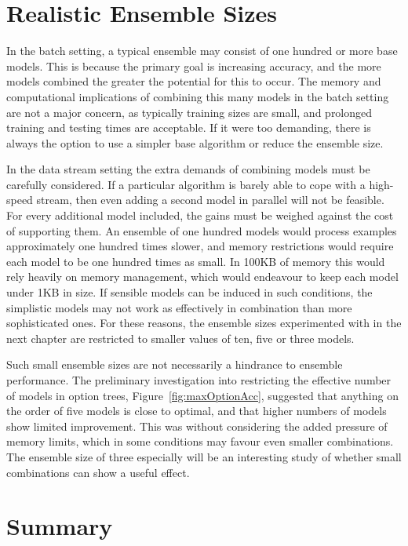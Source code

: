 \section{Realistic Ensemble Sizes}
\label{sec:enssizes}

In the batch setting, a typical ensemble may consist of one hundred or more base models. This is because the primary goal is increasing accuracy, and the more models combined the greater the potential for this to occur. The memory and computational implications of combining this many models in the batch setting are not a major concern, as typically training sizes are small, and prolonged training and testing times are acceptable. If it were too demanding, there is always the option to use a simpler base algorithm or reduce the ensemble size.

In the data stream setting the extra demands of combining models must be carefully considered. If a particular algorithm is barely able to cope with a high-speed stream, then even adding a second model in parallel will not be feasible. For every additional model included, the gains must be weighed against the cost of supporting them. An ensemble of one hundred models would process examples approximately one hundred times slower, and memory restrictions would require each model to be one hundred times as small. In 100KB of memory this would rely heavily on memory management, which would endeavour to keep each model under 1KB in size. If sensible models can be induced in such conditions, the simplistic models may not work as effectively in combination than more sophisticated ones. For these reasons, the ensemble sizes experimented with in the next chapter are restricted to smaller values of ten, five or three models.

Such small ensemble sizes are not necessarily a hindrance to ensemble performance. The preliminary investigation into restricting the effective number of models in option trees, Figure~\ref{fig:maxOptionAcc}, suggested that anything on the order of five models is close to optimal, and that higher numbers of models show limited improvement. This was without considering the added pressure of memory limits, which in some conditions may favour even smaller combinations. The ensemble size of three especially will be an interesting study of whether small combinations can show a useful effect.

\BEGINOMIT
\section{Summary}

